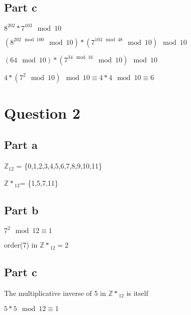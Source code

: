 \documentclass[11pt]{article}
\newcommand{\field}[1]{\mathbb{#1}}
\begin{document}
\subsection{Part c}

\begin{flushleft}
$ 8^{202} * 7^{103}  \mod 10$

$ (8^{202 \mod 100} \mod 10)*( 7^{103 \mod 48} \mod 10) \mod 10 $

$ (64 \mod 10)*(7^{34 \mod 16} \mod 10) \mod 10 $

$ 4 * ( 7^2 \mod 10 ) \mod 10 \equiv 4*4 \mod 10  \equiv 6 $


\end{flushleft}

\section{\sc Question 2}

\subsection{Part a}

\begin{flushleft}
$ \field{Z}_{12}$ = \{0,1,2,3,4,5,6,7,8,9,10,11\} 

$ \field{Z*}_{12} $= \{1,5,7,11\} 
\end{flushleft}

\subsection{Part b}

\begin{flushleft}
$ 7^2 \mod 12 \equiv 1 $

order(7) in $\field{Z*}_{12} = 2$

\end{flushleft}


\subsection{Part c}

\begin{flushleft}
The multiplicative inverse of 5 in $\field{Z*}_{12}$ is itself

$ 5*5 \mod 12 \equiv 1 $



\end{flushleft}
\end{document}

